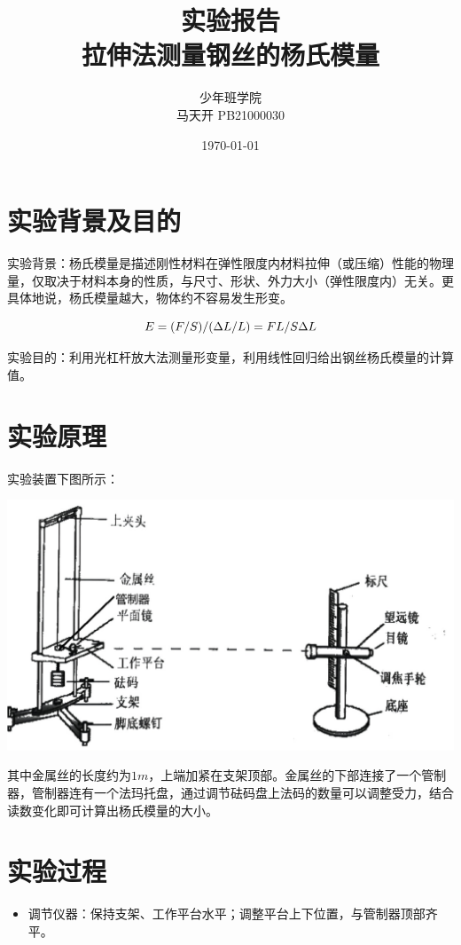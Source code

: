\documentclass[a4paper]{ltxdoc}
\title {实验报告\\拉伸法测量钢丝的杨氏模量}
\author {少年班学院\\马天开 PB21000030}
\date {\today}
\newenvironment{Figure}
  {\par\medskip\noindent\minipage{\linewidth}}
  {\endminipage\par\medskip}
\begin{document}
\begin{multicols}{2}
    \maketitle

    \section{实验背景及目的}

    实验背景：杨氏模量是描述刚性材料在弹性限度内材料拉伸（或压缩）性能的物理量，仅取决于材料本身的性质，与尺寸、形状、外力大小（弹性限度内）无关。更具体地说，杨氏模量越大，物体约不容易发生形变。

    \begin{equation}
        E = (F/S) / (\Delta L / L) = FL/S\Delta L
        \notag
    \end{equation}

    实验目的：利用光杠杆放大法测量形变量，利用线性回归给出钢丝杨氏模量的计算值。

    \section{实验原理}

    实验装置下图所示：

    \begin{Figure}
        \centering
        \includegraphics[width=\linewidth]{img/1.png}
    \end{Figure}

    其中金属丝的长度约为$1m$，上端加紧在支架顶部。金属丝的下部连接了一个管制器，管制器连有一个法玛托盘，通过调节砝码盘上法码的数量可以调整受力，结合读数变化即可计算出杨氏模量的大小。

    \section{实验过程}

    \begin{itemize}
        \item 调节仪器：保持支架、工作平台水平；调整平台上下位置，与管制器顶部齐平。
    \end{itemize}

\end{multicols}
\end{document}
